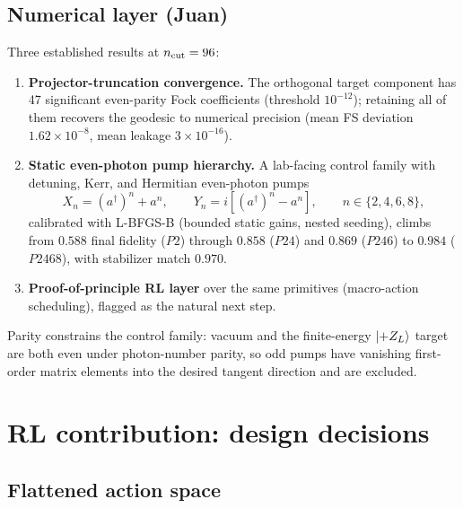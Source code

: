 \documentclass[11pt]{article}
\newcommand{\adag}{a^\dagger}
\begin{document}
\subsection*{Numerical layer (Juan)}

Three established results at $n_{\rm cut} = 96$:
\begin{enumerate}
  \item \textbf{Projector-truncation convergence.} The orthogonal target component has 47 significant even-parity Fock coefficients (threshold $10^{-12}$); retaining all of them recovers the geodesic to numerical precision (mean FS deviation $1.62\times10^{-8}$, mean leakage $3\times10^{-16}$).
  \item \textbf{Static even-photon pump hierarchy.} A lab-facing control family with detuning, Kerr, and Hermitian even-photon pumps
  \begin{equation}
  X_n = (\adag)^n + a^n, \qquad Y_n = i\left[(\adag)^n - a^n\right], \qquad n \in \{2,4,6,8\},
  \end{equation}
  calibrated with L-BFGS-B (bounded static gains, nested seeding), climbs from $0.588$ final fidelity ($P2$) through $0.858$ ($P24$) and $0.869$ ($P246$) to $\mathbf{0.984}$ ($P2468$), with stabilizer match $0.970$.
  \item \textbf{Proof-of-principle RL layer} over the same primitives (macro-action scheduling), flagged as the natural next step.
\end{enumerate}
Parity constrains the control family: vacuum and the finite-energy $\ket{+Z_L}$ target are both even under photon-number parity, so odd pumps have vanishing first-order matrix elements into the desired tangent direction and are excluded.

\section{RL contribution: design decisions}

\subsection*{Flattened action space}
\end{document}
